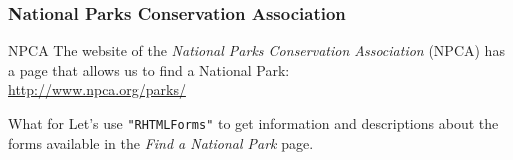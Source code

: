 \documentclass{beamer}\usepackage[]{graphicx}\usepackage[]{color}
\newcommand{\code}[1]{\texttt{#1}}
\begin{document}
{ %
    \begin{frame}[plain]
     \end{frame}
}


\begin{frame}
\frametitle{National Parks Conservation Association}

\begin{block}{NPCA}
The website of the \textit{National Parks Conservation Association} (NPCA) has a page that allows us to find a National Park: \\
{\footnotesize \url{http://www.npca.org/parks/}}
\end{block}

\begin{block}{What for}
Let's use \code{"RHTMLForms"} to get information and descriptions about the forms available in the \textit{Find a National Park} page.
\end{block}

\end{frame}

\end{document}
